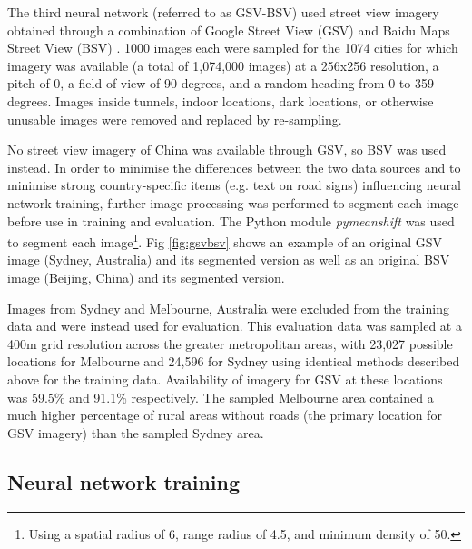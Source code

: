 \documentclass[10pt,letterpaper]{article}
\begin{document}
The third neural network (referred to as GSV-BSV) used street view imagery obtained through a combination of Google Street View (GSV) \cite{GoogleMaps2017b} and Baidu Maps Street View (BSV) \cite{Baidu2017}. 1000 images each were sampled for the 1074 cities for which imagery was available (a total of 1,074,000 images) at a 256x256 resolution, a pitch of 0, a field of view of 90 degrees, and a random heading from 0 to 359 degrees. Images inside tunnels, indoor locations, dark locations, or otherwise unusable images were removed and replaced by re-sampling.

No street view imagery of China was available through GSV, so BSV was used instead.  In order to minimise the differences between the two data sources and to minimise strong country-specific items (e.g. text on road signs) influencing neural network training, further image processing was performed to segment each image before use in training and evaluation. The Python module \textit{pymeanshift} \cite{Pymeanshift2017} was used to segment each image\footnote{Using a spatial radius of 6, range radius of 4.5, and minimum density of 50.}. Fig \ref{fig:gsvbsv} shows an example of an original GSV image (Sydney, Australia) and its segmented version as well as an original BSV image (Beijing, China) and its segmented version.


Images from Sydney and Melbourne, Australia were excluded from the training data and were instead used for evaluation. This evaluation data was sampled at a 400m grid resolution across the greater metropolitan areas, with 23,027 possible locations for Melbourne and 24,596 for Sydney using identical methods described above for the training data. Availability of imagery for GSV at these locations was 59.5\% and 91.1\% respectively. The sampled Melbourne area contained a much higher percentage of rural areas without roads (the primary location for GSV imagery) than the sampled Sydney area.


\subsection*{Neural network training}\label{sec:methods4}    
\end{document}
